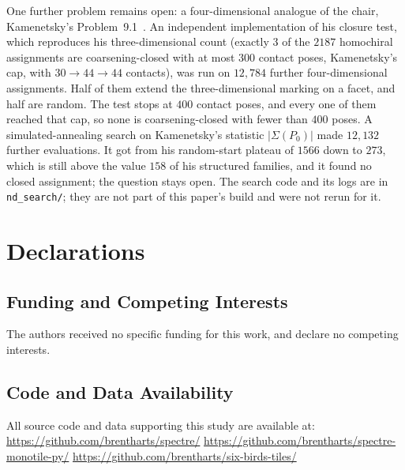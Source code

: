 \documentclass[11pt]{article}
\theoremstyle{definition}
\theoremstyle{remark}
\newcommand{\code}[1]{\texttt{#1}}
\begin{document}
One further problem remains open: a four-dimensional analogue of the chair, Kamenetsky's Problem~9.1~\cite{Kamenetsky}.
An independent implementation of his closure test, which reproduces his three-dimensional count (exactly $3$ of the $2187$
homochiral assignments are coarsening-closed with at most $300$ contact poses, Kamenetsky's cap, with $30\to44\to44$
contacts), was run on $12{,}784$ further four-dimensional assignments.  Half of them extend the three-dimensional marking
on a facet, and half are random.  The test stops at $400$ contact poses, and every one of them reached that cap, so none
is coarsening-closed with fewer than $400$ poses.  A simulated-annealing search on Kamenetsky's statistic
$|\Sigma(P_{0})|$ made $12{,}132$ further evaluations.  It got from his random-start plateau of $1566$ down to $273$,
which is still above the value $158$ of his structured families, and it found no closed assignment; the question stays
open.  The search code and its logs are in \code{nd\_search/}; they are not part of this paper's build and were not
rerun for it.


\appendix
\footnotesize

\section*{Declarations}

\subsection*{Funding and Competing Interests}
The authors received no specific funding for this work, and declare no competing interests.

\subsection*{Code and Data Availability}
\label{sec:supp}

All source code and data supporting this study are available at:
\newline
\url{https://github.com/brentharts/spectre/}
\newline
\url{https://github.com/brentharts/spectre-monotile-py/}
\newline
\url{https://github.com/brentharts/six-birds-tiles/}
\end{document}

